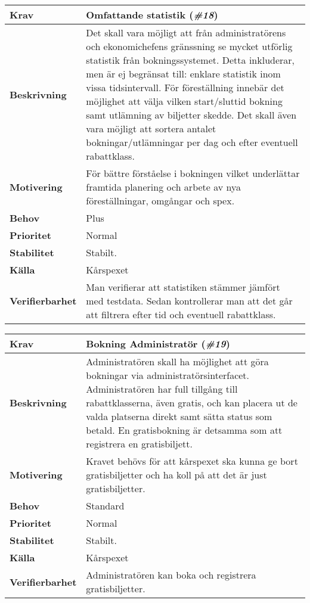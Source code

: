 \documentclass[a4paper, twoside, 11pt, titlepage]{article}
\begin{document}
	\begin{tabular} { p{2.6cm} p{12.5cm} }
		\hline
		\sffamily\textbf{Krav} & Omfattande statistik (\emph{\#18})  \\
		\hline
		\sffamily\textbf{Beskrivning} & Det skall vara möjligt att från administratörens och ekonomichefens gränssning se mycket utförlig statistik från bokningssystemet. Detta inkluderar, men är ej begränsat till: enklare statistik inom vissa tidsintervall. För föreställning innebär det möjlighet att välja vilken start/sluttid bokning samt utlämning av biljetter skedde. Det skall även vara möjligt att sortera antalet bokningar/utlämningar per dag och efter eventuell rabattklass.  \\
		\hline
		\sffamily\textbf{Motivering} & För bättre förståelse i bokningen vilket underlättar framtida planering och arbete av nya föreställningar, omgångar och spex.  \\
		\hline
		\sffamily\textbf{Behov} & Plus  \\
		\hline
		\sffamily\textbf{Prioritet} & Normal  \\
		\hline
		\sffamily\textbf{Stabilitet} & Stabilt.  \\
		\hline
		\sffamily\textbf{Källa} & Kårspexet  \\
		\hline
		\sffamily\textbf{Verifierbarhet} & Man verifierar att statistiken stämmer jämfört med testdata. Sedan kontrollerar man att det går att filtrera efter tid och eventuell rabattklass.  \\
		\hline
	\end{tabular}
	\vspace{6mm}

	\begin{tabular} { p{2.6cm} p{12.5cm} }
		\hline
		\sffamily\textbf{Krav} & Bokning Administratör (\emph{\#19})  \\
		\hline
		\sffamily\textbf{Beskrivning} & Administratören skall ha möjlighet att göra bokningar via administratörsinterfacet. Administratören har full tillgång till rabattklasserna, även gratis, och kan placera ut de valda platserna direkt samt sätta status som betald. En gratisbokning är detsamma som att registrera en gratisbiljett.  \\
		\hline
		\sffamily\textbf{Motivering} & Kravet behövs för att kårspexet ska kunna ge bort gratisbiljetter och ha koll på att det är just gratisbiljetter.  \\
		\hline
		\sffamily\textbf{Behov} & Standard  \\
		\hline
		\sffamily\textbf{Prioritet} & Normal  \\
		\hline
		\sffamily\textbf{Stabilitet} & Stabilt.  \\
		\hline
		\sffamily\textbf{Källa} & Kårspexet  \\
		\hline
		\sffamily\textbf{Verifierbarhet} & Administratören kan boka och registrera gratisbiljetter.  \\
		\hline
	\end{tabular}
	\vspace{6mm}
\end{document}
